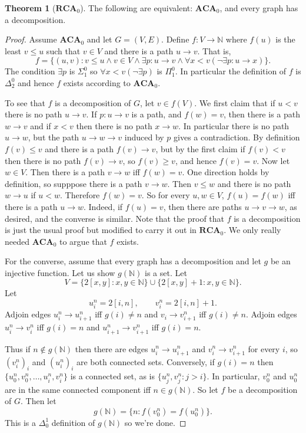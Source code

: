 \documentclass[12pt]{book}
\newcommand{\NN}{\mathbb{N}}
\newcommand{\ACA}{\mathbf{ACA}}
\newcommand{\RCA}{\mathbf{RCA}}
\theoremstyle{definition}
\newtheorem{theorem}{Theorem}[chapter]
\begin{document}
\begin{theorem}[$\RCA_0$]
The following are equivalent: $\ACA_0$, and every graph has a decomposition.
\end{theorem}
\begin{proof}
Assume $\ACA_0$ and let $G = (V, E)$.
Define $f: V \to \NN$ where $f(u)$ is the least $v \leq u$ such that $v \in V$ and there is a path $u \to v$.
That is,
$$f = \{(u, v): v \leq u \wedge v \in V \wedge \exists p: u \to v \wedge \forall x < v(\neg \exists p: u \to x)\}.$$
The condition $\exists p$ is $\Sigma_1^0$ so $\forall x < v(\neg \exists p)$ is $\Pi_1^0$.
In particular the definition of $f$ is $\Delta_2^0$ and hence $f$ exists according to $\ACA_0$.

To see that $f$ is a decomposition of $G$, let $v \in f(V)$.
We first claim that if $u < v$ there is no path $u \to v$.
If $p: u \to v$ is a path, and $f(w) = v$, then there is a path $w \to v$ and if $x < v$ then there is no path $x \to w$.
In particular there is no path $u \to w$, but the path $u \to w \to v$ induced by $p$ gives a contradiction.
By definition $f(v) \leq v$ and there is a path $f(v) \to v$, but by the first claim if $f(v) < v$ then there is no path $f(v) \to v$, so $f(v) \geq v$, and hence $f(v) = v$.
Now let $w \in V$. Then there is a path $v \to w$ iff $f(w) = v$.
One direction holds by definition, so supppose there is a path $v \to w$.
Then $v \leq w$ and there is no path $w \to u$ if $u < w$.
Therefore $f(w) = v$.
So for every $u,w \in V$, $f(u) = f(w)$ iff there is a path $u \to w$. Indeed, if $f(u) = v$, then there are paths $u \to v \to w$, as desired, and the converse is similar.
Note that the proof that $f$ is a decomposition is just the usual proof but modified to carry it out in $\RCA_0$.
We only really needed $\ACA_0$ to argue that $f$ exists.

For the converse, assume that every graph has a decomposition and let $g$ be an injective function.
Let us show $g(\NN)$ is a set.
Let
$$V = \{2[x, y]: x, y \in \NN\} \cup \{2[x, y] + 1: x, y \in \NN\}.$$
Let
$$u_i^n = 2[i, n], \qquad v_i^n = 2[i, n] + 1.$$
Adjoin edges $u_i^n \to u_{i+1}^n$ iff $g(i) \neq n$ and $v_i \to v_{i+1}^n$ iff $g(i) \neq n$.
Adjoin edges $u_i^n \to v_i^n$ iff $g(i) = n$ and $u_{i+1}^n \to v_{i+1}^n$ iff $g(i) = n$.

Thus if $n \notin g(\NN)$ then there are edges $u_i^n \to u_{i+1}^n$ and $v_i^n \to v_{i+1}^n$ for every $i$, so $(v_i^n)_i$ and $(u_i^n)_i$ are both connected sets.
Conversely, if $g(i) = n$ then $\{u_0^n, v_0^n, \dots, u_i^n, v_i^n\}$ is a connected set, as is $\{u_j^n, v_j^n: j > i\}$.
In particular, $v_0^n$ and $u_0^n$ are in the same connected component iff $n \in g(\NN)$.
So let $f$ be a decomposition of $G$. Then let
$$g(\NN) = \{n: f(v_0^n) = f(u_0^n)\}.$$
This is a $\Delta_0^1$ definition of $g(\NN)$ so we're done.
\end{proof}
\end{document}
